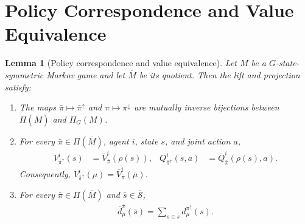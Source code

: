 \documentclass{article}
\theoremstyle{plain}
\newtheorem{lemma}[theorem]{Lemma}
\theoremstyle{definition}
\theoremstyle{remark}
\newcommand{\St}{\mathcal{S}}
\newcommand{\quotient}[1]{\overline{#1}}
\newcommand{\Vbar}{\overline{V}}
\newcommand{\Qbar}{\overline{Q}}
\newcommand{\dbar}{\overline{d}}
\begin{document}
\section{Policy Correspondence and Value Equivalence}
\label{app:proof-policy-correspondence}

\begin{lemma}[Policy correspondence and value equivalence]
\label{lemma:policy-correspondence}
Let $M$ be a $G$-state-symmetric Markov game and let $\quotient M$ be its
quotient. Then the lift and projection satisfy:
\begin{enumerate}[label=(\alph*),leftmargin=2.2em,itemsep=2pt]
  \item \label{item:lift-invariant}
  The maps $\bar\pi\mapsto\bar\pi^\uparrow$ and
  $\pi\mapsto\pi^\downarrow$ are mutually inverse bijections between
  $\Pi(\quotient M)$ and $\Pi_G(M)$.
  \item \label{item:value-equivalence}
  For every $\bar\pi\in\Pi(\quotient M)$, agent $i$, state $s$, and joint action
  $a$,
  \begin{align}
    V^i_{\bar\pi^\uparrow}(s)
    &=
    \Vbar^i_{\bar\pi}(\rho(s)),&
    Q^i_{\bar\pi^\uparrow}(s,a)
    &=
    \Qbar^i_{\bar\pi}(\rho(s),a).
    \label{eq:value-equivalence}
  \end{align}
  Consequently,
  $V^i_{\bar\pi^\uparrow}(\mu)=\Vbar^i_{\bar\pi}(\quotient\mu)$.
  \item \label{item:visitation-equivalence}
  For every $\bar\pi\in\Pi(\quotient M)$ and $\bar s\in\quotient\St$,
  \begin{align}
    \dbar^{\bar\pi}_{\quotient\mu}(\bar s)
    =
    \sum_{s\in\bar s}d^{\bar\pi^\uparrow}_\mu(s).
    \label{eq:visitation-equivalence}
  \end{align}
\end{enumerate}
\end{lemma}
\end{document}
